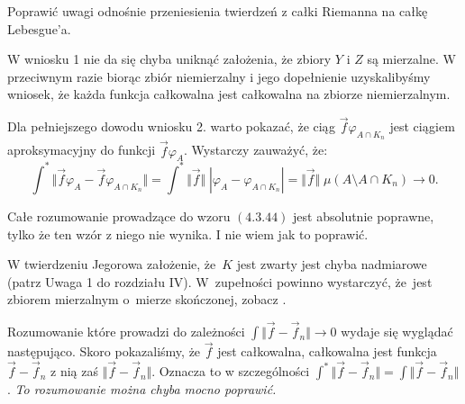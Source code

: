 \documentclass[a4paper,11pt]{article}
\begin{document}
\vspace{\spaceFour}


\start {} Poprawić uwagi odnośnie przeniesienia twierdzeń z
całki Riemanna na całkę Lebesgue’a.

\vspace{\spaceFour}


\start {} W wniosku 1 nie da się chyba uniknąć założenia, że
zbiory $Y$ i $Z$ są mierzalne. W przeciwnym razie biorąc zbiór
niemierzalny i jego dopełnienie uzyskalibyśmy wniosek, że każda
funkcja całkowalna jest całkowalna na zbiorze niemierzalnym.

\vspace{\spaceFour}


\start {} Dla pełniejszego dowodu wniosku 2. warto pokazać, że
ciąg $\vec{ f } \varphi_{ A \cap K_{ n } }$ jest ciągiem
aproksymacyjny do funkcji $\vec{ f } \varphi_{ A }$. Wystarczy
zauważyć, że:
\begin{equation}
  \label{eq:SchwartzKAMVolI-07}
  \int^{ * } \Vert \vec{ f } \varphi_{ A } - \vec{ f } \varphi_{ A \cap K_{ n } } \Vert
  = \int^{ * } \Vert \vec{ f } \Vert \; | \varphi_{ A } - \varphi_{ A \cap K_{ n } } |
  = \Vert \vec{ f } \Vert \; \mu( A \setminus A \cap K_{ n } ) \to 0.
\end{equation}

\start {} Całe rozumowanie prowadzące do wzoru $(4.3.44)$ jest
absolutnie poprawne, tylko że ten wzór z niego nie wynika. I nie wiem
jak to poprawić.

\vspace{\spaceFour}


\start {} W twierdzeniu Jegorowa założenie, że~$K$ jest zwarty
jest chyba nadmiarowe (patrz Uwaga 1 do rozdziału IV). W~zupełności
powinno wystarczyć, że~jest zbiorem mierzalnym o~mierze skończonej,
zobacz \cite{RudinAnalizaRzeczywistaIZespolona1998}.

\vspace{\spaceFour}


\start {} Rozumowanie które prowadzi do zależności
$\int \Vert \vec{ f } - \vec{ f }_{ n } \Vert \to 0$ wydaje się wyglądać
następująco. Skoro pokazaliśmy, że $\vec{ f }$ jest całkowalna,
całkowalna jest funkcja $\vec{ f } - \vec{ f }_{ n }$ z nią zaś
$\Vert \vec{ f } - \vec{ f }_{ n } \Vert$. Oznacza to w szczególności
$\int^{ * } \Vert \vec{ f } - \vec{ f }_{ n } \Vert = \int \Vert \vec{ f } -
\vec{ f }_{ n } \Vert$. \textit{To rozumowanie można chyba mocno poprawić.}
\end{document}
